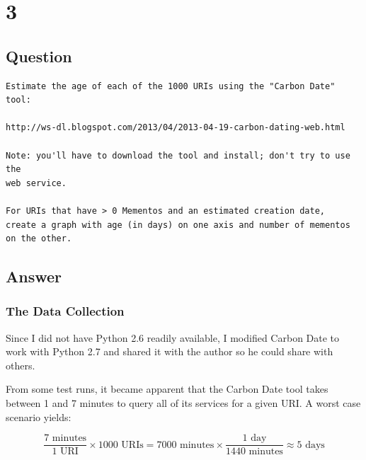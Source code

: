 \documentclass[letterpaper,11pt]{article}
\begin{document}
\newpage



\newpage


\newpage
\section*{3}

\subsection*{Question}

\begin{verbatim}
Estimate the age of each of the 1000 URIs using the "Carbon Date" tool:

http://ws-dl.blogspot.com/2013/04/2013-04-19-carbon-dating-web.html

Note: you'll have to download the tool and install; don't try to use the 
web service.  

For URIs that have > 0 Mementos and an estimated creation date,
create a graph with age (in days) on one axis and number of mementos
on the other.
\end{verbatim}

\newpage
\subsection*{Answer}

\subsubsection*{The Data Collection}
Since I did not have Python 2.6 readily available, I modified Carbon Date to work with Python 2.7 and shared it with the author so he could share with others.

From some test runs, it became apparent that the Carbon Date tool takes between 1 and 7 minutes to query all of its services for a given URI.  A worst case scenario yields:

\[
\frac{7 \textrm{ minutes}}{1 \textrm{ URI}} \times {1000 \textrm{ URIs}} = {7000 \textrm{ minutes}} \times \frac{1 \textrm{ day}}{1440 \textrm{ minutes}} \approx {5 \textrm{ days}}
\]
\end{document}
